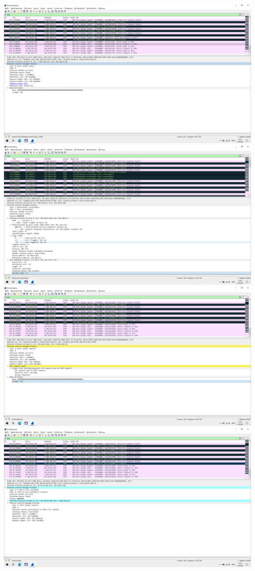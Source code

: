 \includegraphics{screenshots/tracert-d_success_response_1}
\includegraphics{screenshots/tracert_port_1}
\includegraphics{screenshots/tracert_ttl_request_1}
\includegraphics{screenshots/tracert_ttl_response_1}
